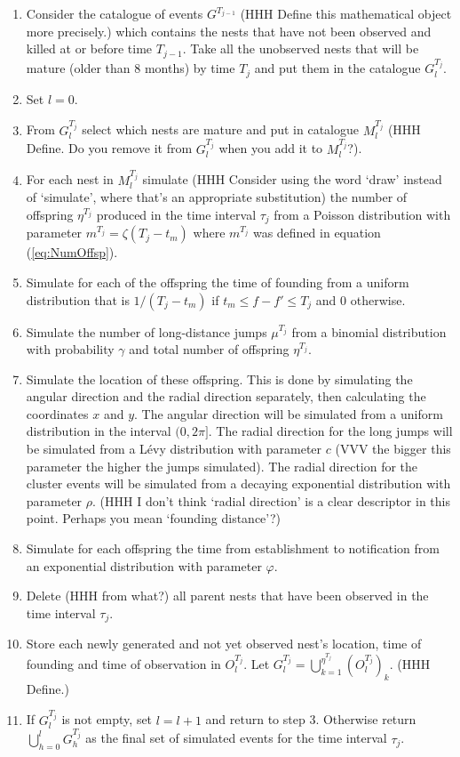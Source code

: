 \documentclass{article}
\begin{document}
\begin{enumerate}
    \item Consider the catalogue of events $G^{T_{j-1}}$ (HHH Define this mathematical object more precisely.) which contains the nests that have not been observed and killed at or before time $T_{j-1}$. Take all the unobserved nests that will be mature (older than 8 months) by time $T_j$ and put them in the catalogue $G_l^{T_j}$.
    \item Set $l = 0$.
    \item From $G_l^{T_j}$ select which nests are mature and put in catalogue $M_l^{T_j}$ (HHH Define. Do you remove it from $G_l^{T_j}$ when you add it to $M_l^{T_j}$?).
    \item For each nest in $M_l^{T_j}$ simulate (HHH Consider using the word `draw' instead of `simulate', where that's an appropriate substitution) the number of offspring $\eta^{T_j}$ produced in the time interval $\tau_j$ from a Poisson distribution with parameter $ m^{T_j} = \zeta (T_j-t_m)$ where $m^{T_j}$ was defined in equation (\ref{eq:NumOffsp}).
    \item Simulate for each of the offspring the time of founding from a uniform distribution that is $1/(T_j-t_m)$ if $t_m \leq f - f' \leq T_j$ and $0$ otherwise.
    \item Simulate the number of long-distance jumps $\mu^{T_j}$ from a binomial distribution with probability $\gamma$ and total number of offspring $\eta^{T_j}$.
    \item Simulate the location of these offspring. This is done by simulating the angular direction and the radial direction separately, then calculating the coordinates $x$ and $y$. The angular direction will be simulated from a uniform distribution in the interval $(0, 2\pi]$. The radial direction for the long jumps will be simulated from a L\'evy distribution with parameter $c$ (VVV the bigger this parameter the higher the jumps simulated). The radial direction for the cluster events will be simulated from a decaying exponential distribution with parameter $\rho$. (HHH I don't think `radial direction' is a clear descriptor in this point. Perhaps you mean `founding distance'?)
    \item Simulate for each offspring the time from establishment to notification from an exponential distribution with parameter $\varphi$.
    \item Delete (HHH from what?) all parent nests that have been observed in the time interval $\tau_j$.
    \item Store each newly generated and not yet observed nest's location, time of founding and time of observation in $O_l^{T_j}$. Let $G_{l}^{T_j} = \bigcup_{k=1}^{\eta^{T_j}} (O_l^{T_j})_k$. (HHH Define.)
    \item If $G_l^{T_j}$ is not empty, set $l = l+1$ and return to step 3. Otherwise return $\bigcup_{h=0}^l G^{T_j}_h$ as the final set of simulated events for the time interval $\tau_j$.
\end{enumerate}
\end{document}
